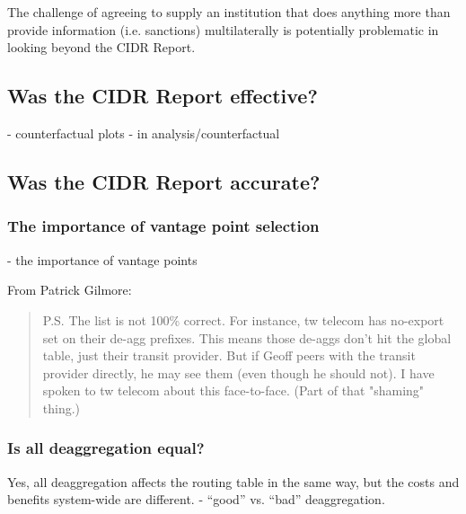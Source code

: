 \chapter{}
\label{chap:discussion}


The challenge of agreeing to supply an institution that does anything more than provide information (i.e. sanctions) multilaterally is potentially problematic in looking beyond the CIDR Report.


\section{Was the CIDR Report effective?}
- counterfactual plots
- in analysis/counterfactual

\section{Was the CIDR Report accurate?}
\subsection{The importance of vantage point selection}
- the importance of vantage points

From Patrick Gilmore:

\begin{quote}
P.S. The list is not 100\% correct.  For instance, tw telecom has no-export set on their de-agg prefixes.  This means those de-aggs don't hit the global table, just their transit provider.  But if Geoff peers with the transit provider directly, he may see them (even though he should not).  I have spoken to tw telecom about this face-to-face.  (Part of that "shaming" thing.)
\end{quote}

\subsection{Is all deaggregation equal?}
Yes, all deaggregation affects the routing table in the same way, but the costs and benefits system-wide are different.
- ``good'' vs. ``bad'' deaggregation.

